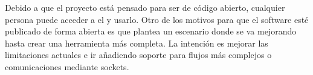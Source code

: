 Debido a que el proyecto está pensado para ser de código abierto, cualquier persona puede acceder a el y usarlo.
Otro de los motivos para que el software esté publicado de forma abierta es que plantea un escenario donde se va mejorando hasta crear una herramienta más completa.
La intención es mejorar las limitaciones actuales e ir añadiendo soporte para flujos más complejos o comunicaciones mediante sockets.


